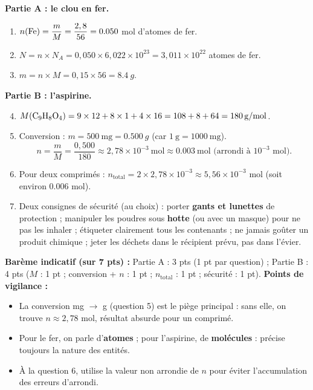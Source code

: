 \documentclass[11pt]{article}
\begin{document}
\begin{corrige}
\textbf{Partie A : le clou en fer.}
\begin{enumerate}
\item $n(\ce{Fe}) = \dfrac{m}{M} = \dfrac{2,8}{56} = \num{0,050}$ mol d'atomes de fer.
\item $N = n\times N_A = 0,050\times 6,022\times 10^{23} = 3,011\times 10^{22}$ atomes de fer.
\item $m = n\times M = 0,15\times 56 = \SI{8,4}{g}$.
\end{enumerate}
\textbf{Partie B : l'aspirine.}
\begin{enumerate}
\setcounter{enumi}{3}
\item $M(\ce{C9H8O4}) = 9\times 12 + 8\times 1 + 4\times 16 = 108 + 8 + 64 = \SI{180}{g/mol}$.
\item Conversion : $m = 500\ \text{mg} = \SI{0,500}{g}$ (car $1\ \text{g} = 1000\ \text{mg}$).
\[ n = \dfrac{m}{M} = \dfrac{0,500}{180} \approx 2,78\times 10^{-3}\ \text{mol} \approx \num{0,003}\ \text{mol (arrondi à } 10^{-3}\text{ mol)}. \]
\item Pour deux comprimés : $n_{\text{total}} = 2\times 2,78\times 10^{-3} \approx 5,56\times 10^{-3}$ mol (soit environ \num{0,006} mol).
\item Deux consignes de sécurité (au choix) : porter \textbf{gants et lunettes} de protection ; manipuler les poudres sous \textbf{hotte} (ou avec un masque) pour ne pas les inhaler ; étiqueter clairement tous les contenants ; ne jamais goûter un produit chimique ; jeter les déchets dans le récipient prévu, pas dans l'évier.
\end{enumerate}
\textbf{Barème indicatif (sur 7 pts) :} Partie A : 3 pts (1 pt par question) ; Partie B : 4 pts ($M$ : 1 pt ; conversion + $n$ : 1 pt ; $n_{\text{total}}$ : 1 pt ; sécurité : 1 pt).
\textbf{Points de vigilance :}
\begin{itemize}
\item La conversion mg $\rightarrow$ g (question 5) est le piège principal : sans elle, on trouve $n \approx 2,78$ mol, résultat absurde pour un comprimé.
\item Pour le fer, on parle d'\textbf{atomes} ; pour l'aspirine, de \textbf{molécules} : précise toujours la nature des entités.
\item À la question 6, utilise la valeur non arrondie de $n$ pour éviter l'accumulation des erreurs d'arrondi.
\end{itemize}
\end{corrige}
\end{document}
